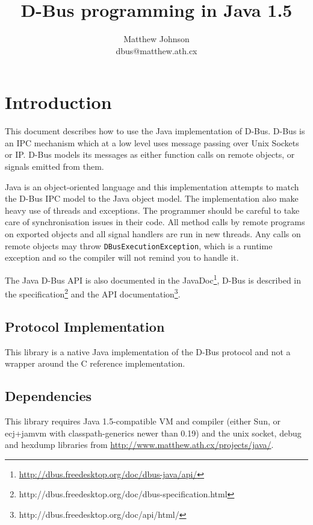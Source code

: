 \documentclass[a4paper,12pt]{article}
\author{Matthew Johnson\\dbus@matthew.ath.cx}
\title{D-Bus programming in Java 1.5}
\begin{document}
\def\javadocroot/{http://dbus.freedesktop.org/doc/dbus-java/api/}

\maketitle

\tableofcontents
\listoffigures
\listoftables

\section{Introduction}

This document describes how to use the Java implementation of D-Bus. D-Bus is
an IPC mechanism which at a low level uses message passing over Unix Sockets or
IP. D-Bus models its messages as either function calls on remote objects, or
signals emitted from them.

Java is an object-oriented language and this implementation attempts to match
the D-Bus IPC model to the Java object model. The implementation also make
heavy use of threads and exceptions. The programmer should be careful to take
care of synchronisation issues in their code. All method calls by remote
programs on exported objects and all signal handlers are run in new threads.
Any calls on remote objects may throw {\tt DBusExecutionException}, which is a
runtime exception and so the compiler will not remind you to handle it.

The Java D-Bus API is also documented in the JavaDoc\footnote{\url{\javadocroot/}},
D-Bus is described in the
specification\footnote{http://dbus.freedesktop.org/doc/dbus-specification.html}
and the API documentation\footnote{http://dbus.freedesktop.org/doc/api/html/}.

\subsection{Protocol Implementation}

This library is a native Java implementation of the D-Bus protocol and not
a wrapper around the C reference implementation. 

\subsection{Dependencies}

This library requires Java 1.5-compatible VM and compiler (either Sun, or
ecj+jamvm with classpath-generics newer than 0.19) and the unix socket, debug
and hexdump libraries from \url{http://www.matthew.ath.cx/projects/java/}.
\end{document}
